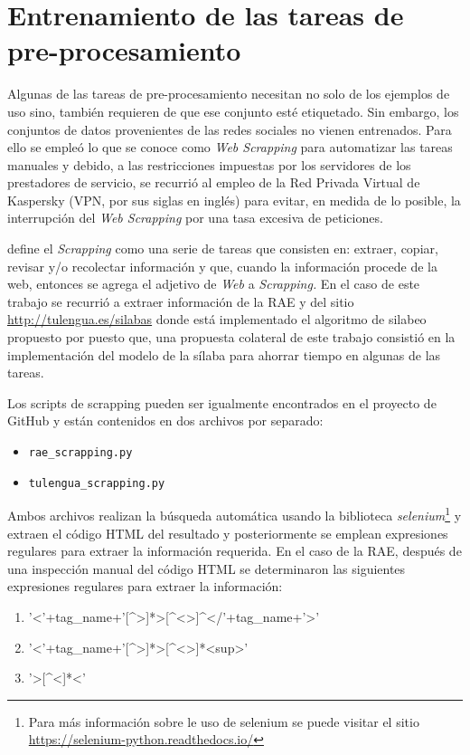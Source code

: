 \section{Entrenamiento de las tareas de pre-procesamiento}
Algunas de las tareas de pre-procesamiento necesitan no solo de los ejemplos de uso sino, también requieren de que ese conjunto esté etiquetado. Sin embargo, los conjuntos de datos provenientes de las redes sociales no vienen entrenados. Para ello se empleó lo que se conoce como \textit{Web Scrapping} para automatizar las tareas manuales y debido, a las restricciones impuestas por los servidores de los prestadores de servicio, se recurrió al empleo de la Red Privada Virtual de Kaspersky (VPN, por sus siglas en inglés) para evitar, en medida de lo posible, la interrupción del \textit{Web Scrapping} por una tasa excesiva de peticiones.

\cite{chapagain2019hands} define el \textit{Scrapping} como una serie de tareas que consisten en: extraer, copiar, revisar y/o recolectar información y que, cuando la información procede de la web, entonces se agrega el adjetivo de \textit{Web} a \textit{Scrapping.} En el caso de este trabajo se recurrió a extraer información de la RAE y del sitio \url{http://tulengua.es/silabas} donde está implementado el algoritmo de silabeo propuesto por \cite{hernandez2013automatic} puesto que, una propuesta colateral de este trabajo consistió en la implementación del modelo de la sílaba para ahorrar tiempo en algunas de las tareas.  

Los scripts de scrapping pueden ser igualmente encontrados en el proyecto de GitHub y están contenidos en dos archivos por separado:
\begin{itemize}
	\item \texttt{rae\_scrapping.py}
	\item \texttt{tulengua\_scrapping.py}
\end{itemize}

Ambos archivos realizan la búsqueda automática usando la biblioteca \textit{selenium}\footnote{Para más información sobre le uso de selenium se puede visitar el sitio \url{https://selenium-python.readthedocs.io/}} y extraen el código HTML del resultado y posteriormente se emplean expresiones regulares para extraer la información requerida. En el caso de la RAE, después de una inspección manual del código HTML se determinaron las siguientes expresiones regulares para extraer la información:

\begin{enumerate}
	\item '\textless'+tag\_name+'[\textasciicircum\textgreater]*\textgreater[\textasciicircum\textless\textgreater]\textasciicircum\textless/'+tag\_name+'\textgreater'
	
	\item '\textless'+tag\_name+'[\textasciicircum\textgreater]*\textgreater[\textasciicircum\textless\textgreater]*\textless sup\textgreater'
	
	\item '\textgreater[\textasciicircum\textless]*\textless'
\end{enumerate}

